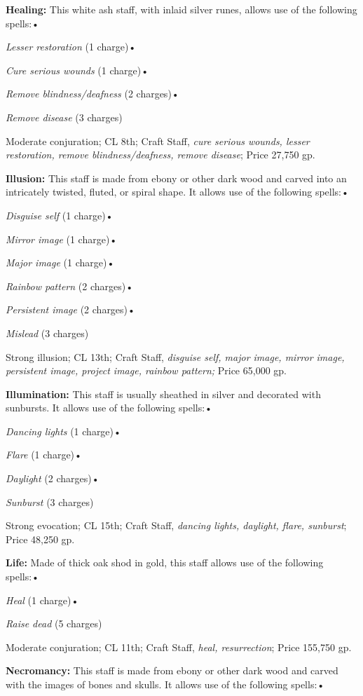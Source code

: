 \documentclass{article}
\begin{document}
\textbf{Healing: }This white ash staff, with inlaid silver runes, allows use of 
the following spells:• 

\textit{Lesser restoration }(1 charge)• 

\textit{Cure serious wounds }(1 charge)• 

\textit{Remove blindness/deafness }(2 charges)• 

\textit{Remove disease }(3 charges)

Moderate conjuration; CL 8th; Craft Staff, \textit{cure serious wounds, lesser 
restoration, remove blindness/deafness, remove disease}; Price 27,750 gp.

\textbf{Illusion:} This staff is made from ebony or other dark wood and carved 
into an intricately twisted, fluted, or spiral shape. It allows use of the following 
spells:• 

\textit{Disguise self }(1 charge)• 

\textit{Mirror image }(1 charge)• 

\textit{Major image }(1 charge)• 

\textit{Rainbow pattern }(2 charges)• 

\textit{Persistent image }(2 charges)• 

\textit{Mislead }(3 charges)

Strong illusion; CL 13th; Craft Staff, \textit{disguise self, major image, mirror 
image, persistent image, project image, rainbow pattern; }Price 65,000 gp.

\textbf{Illumination: }This staff is usually sheathed in silver and decorated with 
sunbursts. It allows use of the following spells:• 

\textit{Dancing lights }(1 charge)• 

\textit{Flare }(1 charge)• 

\textit{Daylight }(2 charges)• 

\textit{Sunburst }(3 charges)

Strong evocation; CL 15th; Craft Staff, \textit{dancing lights, daylight, flare, 
sunburst}; Price 48,250 gp.

\textbf{Life:} Made of thick oak shod in gold, this staff allows use of the following 
spells:• 

\textit{Heal }(1 charge)• 

\textit{Raise dead }(5 charges)

Moderate conjuration; CL 11th; Craft Staff, \textit{heal, resurrection}; Price 
155,750 gp.

\textbf{Necromancy: }This staff is made from ebony or other dark wood and carved 
with the images of bones and skulls. It allows use of the following spells:• 
\end{document}
